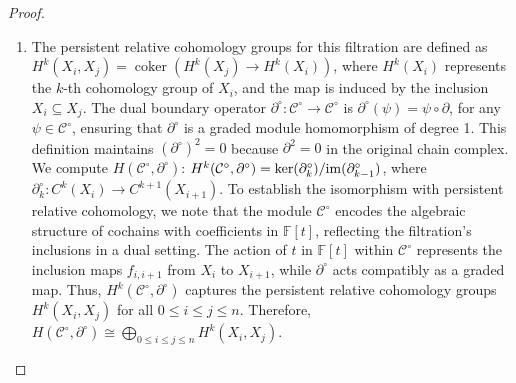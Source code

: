 \begin{proof}
\begin{enumerate}
\item The persistent relative cohomology groups for this filtration are defined as $H^k(X_i, X_j) = \operatorname{coker} \left( H^k(X_j) \to H^k(X_i) \right)$, where \( H^k(X_i) \) represents the \( k \)-th cohomology group of \( X_i \), and the map is induced by the inclusion \( X_i \subseteq X_j \). The dual boundary operator \( \partial^\circ: \mathcal{C}^\circ \to \mathcal{C}^\circ \) is $\partial^\circ(\psi) = \psi \circ \partial$, for any \( \psi \in \mathcal{C}^\circ \), ensuring that \( \partial^\circ \) is a graded module homomorphism of degree 1. This definition maintains \( (\partial^\circ)^2 = 0 \) because \( \partial^2 = 0 \) in the original chain complex. We compute \( H(\mathcal{C}^\circ, \partial^\circ) \): $H^k(\mathcal{C}^\circ, \partial^\circ) = \ker(\partial^\circ_k) / \mathrm{im}(\partial^\circ_{k-1})$, where \( \partial^\circ_k: C^k(X_i) \to C^{k+1}(X_{i+1}) \). To establish the isomorphism with persistent relative cohomology, we note that the module \( \mathcal{C}^\circ \) encodes the algebraic structure of cochains with coefficients in \( \mathbb{F}[t] \), reflecting the filtration's inclusions in a dual setting. The action of \( t \) in \( \mathbb{F}[t] \) within \( \mathcal{C}^\circ \) represents the inclusion maps \( f_{i,i+1} \) from \( X_i \) to \( X_{i+1} \), while \( \partial^\circ \) acts compatibly as a graded map. Thus, \( H^k(\mathcal{C}^\circ, \partial^\circ) \) captures the persistent relative cohomology groups \( H^k(X_i, X_j) \) for all \( 0 \leq i \leq j \leq n \). Therefore, $H(\mathcal{C}^\circ, \partial^\circ) \cong \bigoplus_{0 \leq i \leq j \leq n} H^k(X_i, X_j)$.

\end{enumerate}
\end{proof}
